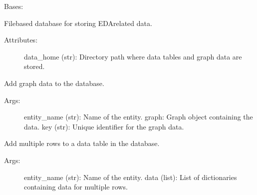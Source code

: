 \documentclass[letterpaper,10pt,english]{sphinxmanual}
\begin{document}

\begin{fulllineitems}
\label{\detokenize{eda_schema:eda_schema.db.FileDB}}
\pysigstartsignatures
{}
\pysigstopsignatures
\sphinxAtStartPar
Bases: {\hyperref[\detokenize{eda_schema:eda_schema.db.BaseDB}]{}}

\sphinxAtStartPar
File\sphinxhyphen{}based database for storing EDA\sphinxhyphen{}related data.
\begin{description}
\item[{Attributes:}] \leavevmode
\sphinxAtStartPar
data\_home (str): Directory path where data tables and graph data are stored.

\end{description}

\begin{fulllineitems}
\label{\detokenize{eda_schema:eda_schema.db.FileDB.add_graph_data}}
\pysigstartsignatures
{}
\pysigstopsignatures
\sphinxAtStartPar
Add graph data to the database.
\begin{description}
\item[{Args:}] \leavevmode
\sphinxAtStartPar
entity\_name (str): Name of the entity.
graph: Graph object containing the data.
key (str): Unique identifier for the graph data.

\end{description}

\end{fulllineitems}


\begin{fulllineitems}
\label{\detokenize{eda_schema:eda_schema.db.FileDB.add_table_data}}
\pysigstartsignatures
{}
\pysigstopsignatures
\sphinxAtStartPar
Add multiple rows to a data table in the database.
\begin{description}
\item[{Args:}] \leavevmode
\sphinxAtStartPar
entity\_name (str): Name of the entity.
data (list): List of dictionaries containing data for multiple rows.


\end{description}
\end{fulllineitems}
\end{fulllineitems}
\end{document}
